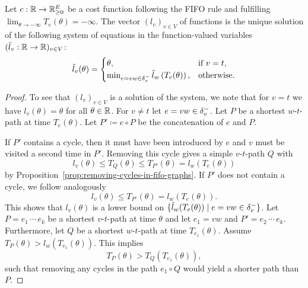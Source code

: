 \begin{proposition}
    Let $c:\mathbb{R}\rightarrow\mathbb{R}_{\geq0}^E$ be a cost function following the FIFO rule and fulfilling $\lim_{\theta\to-\infty} T_e(\theta) = -\infty$.
    The vector $(l_v)_{v\in V}$ of functions is the unique solution of the following system of equations in the function-valued variables $(\tilde l_v: \mathbb{R} \rightarrow \mathbb{R})_{v\in V}$:
    \[
        \tilde l_v(\theta) = \begin{cases}
            \theta, &\text{if $v = t$}, \\
            \min_{\substack{
                e=vw\in\delta^-_{v}               
            }} \tilde{l}_w\left(
                T_e(\theta)
            \right), &\text{otherwise}.
        \end{cases}
    \]
\end{proposition}
\begin{proof}
    To see that $(l_v)_{v\in V}$ is a solution of the system, we note that for $v = t$ we have $l_v(\theta) = \theta$ for all $\theta\in\mathbb{R}$.
    For $v\neq t$ let $e=vw\in\delta^-_{v}$.
    Let $P$ be a shortest $w$-$t$-path at time $T_{e}(\theta)$.
    Let $P'\coloneqq e\circ P$ be the concatenation of $e$ and $P$.

    If $P'$ contains a cycle, then it must have been introduced by $e$ and $v$ must be visited a second time in $P'$.
    Removing this cycle gives a simple $v$-$t$-path $Q$ with 
    \[
        l_{v}(\theta) \leq T_{Q}(\theta)\leq T_{P'}(\theta) = l_{w}(T_{e}(\theta))
    \]
    by Proposition~\ref{prop:removing-cycles-in-fifo-graphs}.
    If $P'$ does not contain a cycle, we follow analogously
    \[
        l_{v}(\theta) \leq T_{P'}(\theta) = l_{w}(T_{e}(\theta)).
    \]
    This shows that $l_v(\theta)$ is a lower bound on $\{ \tilde l_w(
        T_{e}(\theta)
    ) \mid e=vw\in\delta^-_{v}  \}$.
    Let $P = e_1\, \cdots\, e_k$ be a shortest $v$-$t$-path at time $\theta$ and let $e_1=vw$ and $P' = e_2\,\cdots\,e_k$.
    Furthermore, let $Q$ be a shortest $w$-$t$-path at time $T_{e_1}(\theta)$.
    Assume $T_{P}(\theta) > l_{w}(T_{e_1}(\theta))$.
    This implies
    \[
        T_{P}(\theta) > 
        T_{Q}(T_{e_1}(\theta)),
    \]
    such that removing any cycles in the path $e_1\circ Q$ would yield a shorter path than $P$.

\end{proof}
